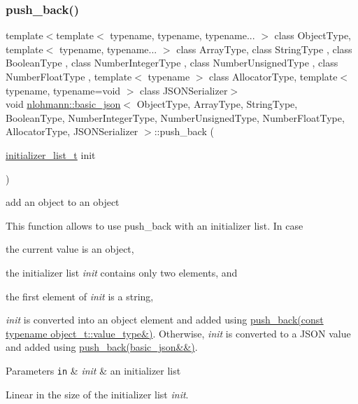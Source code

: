 \subsubsection{\texorpdfstring{push\+\_\+back()}{push\_back()}\hspace{0.1cm}{\footnotesize\ttfamily [4/4]}}
{\footnotesize\ttfamily template$<$template$<$ typename, typename, typename... $>$ class Object\+Type, template$<$ typename, typename... $>$ class Array\+Type, class String\+Type , class Boolean\+Type , class Number\+Integer\+Type , class Number\+Unsigned\+Type , class Number\+Float\+Type , template$<$ typename $>$ class Allocator\+Type, template$<$ typename, typename=void $>$ class J\+S\+O\+N\+Serializer$>$ \\
void \hyperlink{classnlohmann_1_1basic__json}{nlohmann\+::basic\+\_\+json}$<$ Object\+Type, Array\+Type, String\+Type, Boolean\+Type, Number\+Integer\+Type, Number\+Unsigned\+Type, Number\+Float\+Type, Allocator\+Type, J\+S\+O\+N\+Serializer $>$\+::push\+\_\+back (\begin{DoxyParamCaption}\item[{\hyperlink{classnlohmann_1_1basic__json_ad70a098fbc01c53497db29d3b5b656a9}{initializer\+\_\+list\+\_\+t}}]{init }\end{DoxyParamCaption})\hspace{0.3cm}{\ttfamily [inline]}}



add an object to an object 

This function allows to use {\ttfamily push\+\_\+back} with an initializer list. In case


\begin{DoxyEnumerate}
\item the current value is an object,
\item the initializer list {\itshape init} contains only two elements, and
\item the first element of {\itshape init} is a string,
\end{DoxyEnumerate}

{\itshape init} is converted into an object element and added using \hyperlink{classnlohmann_1_1basic__json_ae11a3a51782c058fff2f6550cdfb9b3c}{push\+\_\+back(const typename object\+\_\+t\+::value\+\_\+type\&)}. Otherwise, {\itshape init} is converted to a J\+S\+ON value and added using \hyperlink{classnlohmann_1_1basic__json_ac8e523ddc8c2dd7e5d2daf0d49a9c0d7}{push\+\_\+back(basic\+\_\+json\&\&)}.


\begin{DoxyParams}[1]{Parameters}
\mbox{\tt in}  & {\em init} & an initializer list\\
\hline
\end{DoxyParams}
Linear in the size of the initializer list {\itshape init}.

